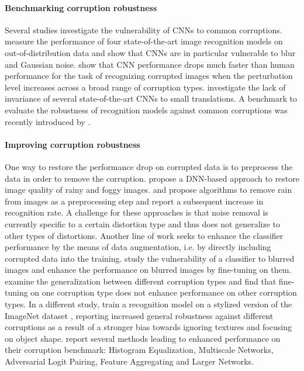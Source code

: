 \documentclass{article}
\begin{document}
\paragraph{Benchmarking corruption robustness}
Several studies investigate the vulnerability of CNNs to common corruptions. \citet{dodge2016understanding} measure the performance of four state-of-the-art image recognition models on out-of-distribution data and show that CNNs are in particular vulnerable to blur and Gaussian noise. \citet{Geirhos2018generalisation} show that CNN performance drops much faster than human performance for the task of recognizing corrupted images when the perturbation level increases across a broad range of corruption types. \citet{azulay2018deep} investigate the lack of invariance of several state-of-the-art CNNs to small translations.
A benchmark to evaluate the robustness of recognition models against common corruptions was recently introduced by \citet{hendrycks2018benchmarking}.

\paragraph{Improving corruption robustness} One way to restore the performance drop on corrupted data is to preprocess the data in order to remove the corruption. \citet{mukherjee2018visual} propose a DNN-based approach to restore image quality of rainy and foggy images.
\citet{bahnsen2018rainremoval} and \citet{bahnsen2019rainremovalsynthetic} propose algorithms to remove rain from images as a preprocessing step and report a subsequent increase in recognition rate. A challenge for these approaches is that noise removal is currently specific to a certain distortion type and thus does not generalize to other types of distortions. 
Another line of work seeks to enhance the classifier performance by the means of data augmentation, i.e. by directly including corrupted data into the training.
\citet{Vasiljevic2016blur} study the vulnerability of a classifier to blurred images and enhance the performance on blurred images by fine-tuning on them.
\citet{Geirhos2018generalisation} examine the generalization between different corruption types and find that fine-tuning on one corruption type does not enhance performance on other corruption types.
In a different study, \citet{geirhos2019imagenettrained} train a recognition model on a stylized version of the ImageNet dataset \citep{Russakovsky2015}, reporting increased general robustness against different corruptions as a result of a stronger bias towards ignoring textures and focusing on object shape.
\citet{hendrycks2018benchmarking} report several methods leading to enhanced performance on their corruption benchmark: Histogram Equalization, Multiscale Networks, Adversarial Logit Pairing, Feature Aggregating and Larger Networks.
\end{document}

